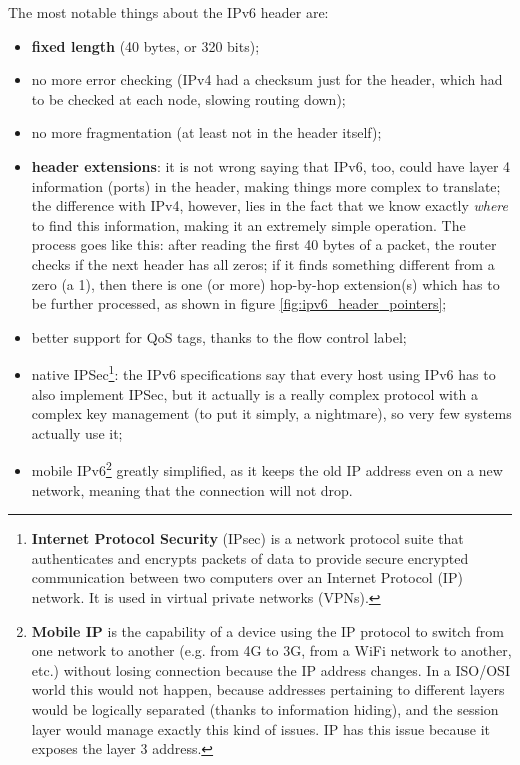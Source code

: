 The most notable things about the IPv6 header are:

\begin{itemize}
    \item \textbf{fixed length} (40 bytes, or 320 bits);
    \item no more error checking (IPv4 had a checksum just for the header, which had to be checked at each node, slowing routing down);
    \item no more fragmentation (at least not in the header itself);
    \item \textbf{header extensions}: it is not wrong saying that IPv6, too, could have layer 4 information (ports) in the header, making things more complex to translate; the difference with IPv4, however, lies in the fact that we know exactly \textit{where} to find this information, making it an extremely simple operation. The process goes like this: after reading the first 40 bytes of a packet, the router checks if the next header has all zeros; if it finds something different from a zero (a 1), then there is one (or more) hop-by-hop extension(s) which has to be further processed, as shown in figure \ref{fig:ipv6_header_pointers};
    \item better support for QoS tags, thanks to the flow control label;
    \item native IPSec\footnote{\textbf{Internet Protocol Security} (IPsec) is a network protocol suite that authenticates and encrypts packets of data to provide secure encrypted communication between two computers over an Internet Protocol (IP) network. It is used in virtual private networks (VPNs).}: the IPv6 specifications say that every host using IPv6 has to also implement IPSec, but it actually is a really complex protocol with a complex key management (to put it simply, a nightmare), so very few systems actually use it;
    \item mobile IPv6\footnote{\textbf{Mobile IP} is the capability of a device using the IP protocol to switch from one network to another (e.g. from 4G to 3G, from a WiFi network to another, etc.) without losing connection because the IP address changes. In a ISO/OSI world this would not happen, because addresses pertaining to different layers would be logically separated (thanks to information hiding), and the session layer would manage exactly this kind of issues. IP has this issue because it exposes the layer 3 address.} greatly simplified, as it keeps the old IP address even on a new network, meaning that the connection will not drop.
\end{itemize}

